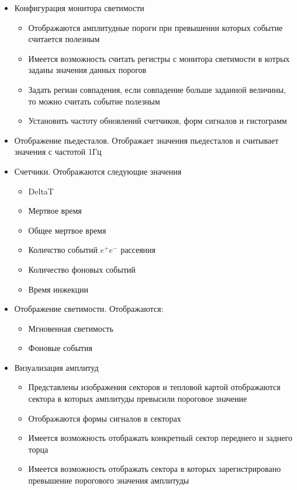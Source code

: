 \begin{itemize}
  \item Конфигурация монитора светимости
    \begin{itemize}
      \item Отображаются амплитудные пороги при превышении которых событие считается полезным
      \item Имеется возможность считать регистры с монитора светимости в котрых заданы значения данных порогов
      \item Задать региан совпадения, если совпадение больше заданной величины, то можно считать событие полезным
      \item Установить частоту обновлений счетчиков, форм сигналов и гистограмм
    \end{itemize} 
  \item Отображение пьедесталов. Отображает значения пьедесталов и считывает значения с частотой 1Гц
  \item Счетчики. Отображаются следующие значения
    \begin{itemize}
      \item DeltaT
      \item Мертвое время 
      \item Общее мертвое время
      \item Количство событий $e^+e^-$ рассеяния
      \item Количество фоновых событий
      \item Время инжекции
    \end{itemize}
  \item Отображение светимости. Отображаются:
    \begin{itemize}
      \item Мгновенная светимость
      \item Фоновые события
    \end{itemize}
  \item Визуализация амплитуд
  \begin{itemize}
    \item Представлены изображения секторов и тепловой картой отображаются сектора в которых амплитуды превысили пороговое значение
    \item Отображаются формы сигналов в секторах
    \item Имеется возможность отображать конкретный сектор переднего и заднего торца
    \item Имеется возможность отображать сектора в которых зарегистрировано превышение порогового значения амплитуды

\end{itemize}
\end{itemize}
